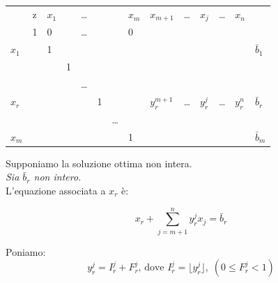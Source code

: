 \begin{table}[h]
	\centering
	\begin{tabular}{llllllllllllll}
		&                       z & $x_{1}$ &    & \dots &     &      & $x_{m}$ & $x_{m+1}$     & \dots & $x_{j}$     & \dots & $x_{n}$     & \\ \cline{2-14}
		& \multicolumn{1}{|l|}{1} & 0       &    & \dots &     &      & 0       &               &     &             &     &             & \multicolumn{1}{|l|}{} \\ \cline{2-14}
		$x_{1}$ & \multicolumn{1}{|l|}{}  & 1       &    &     &     &      &         &               &     &             &     &	           & \multicolumn{1}{|l|}{$\bar{b}_{1}$} \\
		& \multicolumn{1}{|l|}{}  &         & 1  &     &     &      &         &               &     &             &     &             & \multicolumn{1}{|l|}{} \\
		& \multicolumn{1}{|l|}{}  &         &    & \dots &     &      &         &               &     &             &     &             & \multicolumn{1}{|l|}{} \\
		$x_{r}$ & \multicolumn{1}{|l|}{}  &         &    &     & 1   &      &         & $y_{r}^{m+1}$ & \dots & $y_{r}^{j}$ & \dots & $y_{r}^{n}$ & \multicolumn{1}{|l|}{$\bar{b}_{r}$} \\
		& \multicolumn{1}{|l|}{}  &         &    &     &     & \dots  &         &               &     &             &     &             & \multicolumn{1}{|l|}{} \\
		$x_{m}$ & \multicolumn{1}{|l|}{}  &         &    &     &     &      & 1       &               &     &             &     &             & \multicolumn{1}{|l|}{$\bar{b}_{m}$} \\ \cline{2-14}
	\end{tabular}
\end{table}

Supponiamo la soluzione ottima non intera.\\

\emph{Sia $\bar{b}_{r}$ non intero.}
\\

L'equazione associata a $x_{r}$ è:

\begin{equation}\label{eq:2.20}
x_{r} + \sum_{j=m+1}^{n} y_{r}^{j} x_{j} = \bar{b}_{r}
\end{equation}

Poniamo:
\begin{equation}
y_{r}^{j} = I_{r}^{j} + F_{r}^{j}\text{, dove }I_{r}^{j} = \lfloor y_{r}^{j} \rfloor,\;(0 \le F_{r}^{j} < 1)
\end{equation}


